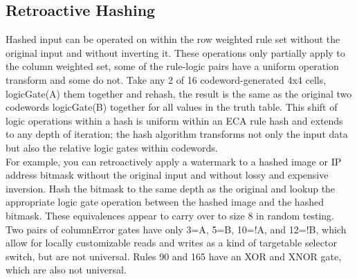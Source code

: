 \documentclass[11pt]{article}
\begin{document}
\subsection{Retroactive Hashing}
Hashed input can be operated on within the row weighted rule set without the original input and without inverting it. These operations only partially apply to the column weighted set, some of the rule-logic pairs have a uniform operation transform and some do not. Take any 2 of 16 codeword-generated 4x4 cells, logicGate(A) them together and rehash, the result is the same as the original two codewords logicGate(B) together for all values in the truth table. This shift of logic operations within a hash is uniform within an ECA rule hash and extends to any depth of iteration; the hash algorithm transforms not only the input data but also the relative logic gates within codewords. \\

For example, you can retroactively apply a watermark to a hashed image or IP address bitmask without the original input and without lossy and expensive inversion. Hash the bitmask to the same depth as the original and lookup the appropriate logic gate operation between the hashed image and the hashed bitmask. These equivalences appear to carry over to size 8 in random testing. Two pairs of columnError gates have only 3=A, 5=B, 10=!A, and 12=!B, which allow for locally customizable reads and writes as a kind of targetable selector switch, but are not universal. Rules 90 and 165 have an XOR and XNOR gate, which are also not universal.  \\
\end{document}
